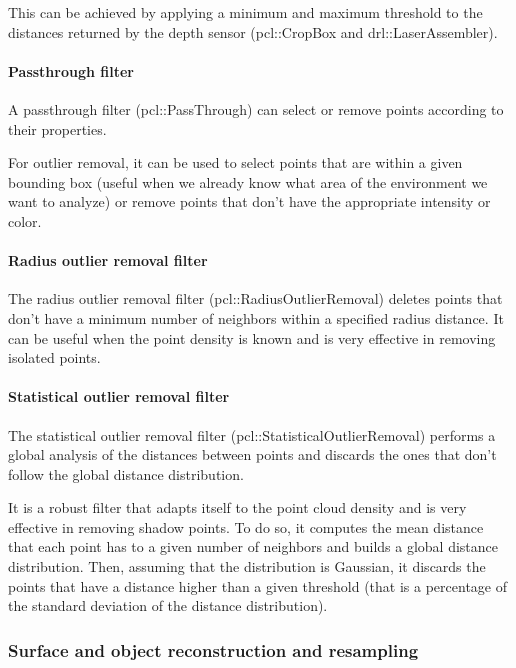 This can be achieved by applying a minimum and maximum threshold to the distances returned by the depth sensor (pcl::CropBox and drl::LaserAssembler).


\paragraph{Passthrough filter}

A passthrough filter (pcl::PassThrough) can select or remove points according to their properties.

For outlier removal, it can be used to select points that are within a given bounding box (useful when we already know what area of the environment we want to analyze) or remove points that don't have the appropriate intensity or color.


\paragraph{Radius outlier removal filter}

The radius outlier removal filter (pcl::RadiusOutlierRemoval) deletes points that don't have a minimum number of neighbors within a specified radius distance. It can be useful when the point density is known and is very effective in removing isolated points.


\paragraph{Statistical outlier removal filter}

The statistical outlier removal filter (pcl::StatisticalOutlierRemoval) \cite{Rusu2010a} performs a global analysis of the distances between points and discards the ones that don't follow the global distance distribution.

It is a robust filter that adapts itself to the point cloud density and is very effective in removing shadow points. To do so, it computes the mean distance that each point has to a given number of neighbors and builds a global distance distribution. Then, assuming that the distribution is Gaussian, it discards the points that have a distance higher than a given threshold (that is a percentage of the standard deviation of the distance distribution).


\subsubsection{Surface and object reconstruction and resampling}\label{subsec:localization_system_surface-reconstruction-resampling}

